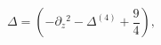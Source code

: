\begin{equation}
\Delta=\left (-\partial_ z{}^2-\Delta^{(4)}+\frac{9}{4}\right),
\label{conformal}
\end{equation}

